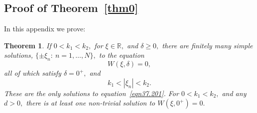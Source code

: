 \documentclass[11pt]{article}
\newcommand\bbR{\mathbb R}
\newtheorem*{theorem*}{Theorem}
\theoremstyle{definition}
\theoremstyle{remark}
\begin{document}
  \subsection{Proof of Theorem~\ref{thm0}}\label{app0}
  In this appendix we prove:
\begin{theorem*}
  If $0<k_1<k_2,$ for $\xi\in\bbR,$ and $\delta\ge 0,$
  there are finitely many simple solutions, $\{\pm \xi_n:\:n=1,\dots, N\},$ to the equation
  \begin{equation}\label{eqn37.201}
    W(\xi,\delta)=0,
  \end{equation}
  all of which satisfy $\delta=0^+,$ and
  \begin{equation}
   k_1<|\xi_n|<k_2.
  \end{equation}
  These are the only solutions to equation~\eqref{eqn37.201}. For 
  $0<k_1<k_2,$ and any $d>0,$ there is at least one non-trivial solution to $W(\xi,0^+)=0.$
\end{theorem*}
\end{document}
